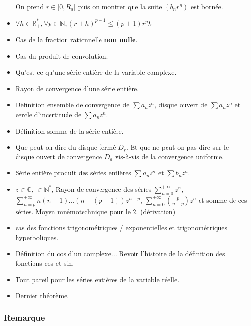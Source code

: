 \documentclass[a4paper, 11pt, hidelinks]{article}
\newcommand{\dsum}[2]{\displaystyle\sum_{#1}^{#2} }
\begin{document}
\begin{itemize}
    On prend $r\in [0,R_a[$ puis on montrer que la suite $(b_nr^n)$ est bornée.
    \item $\forall h \in \mathbb{R}^*_+, \forall p \in \mathbb{N}, (r+h)^{p+1} \leq (p+1)r^ph$
    \item Cas de la fraction rationnelle \textbf{non nulle}.
    \item Cas du produit de convolution.
    \item Qu'est-ce qu'une série entière de la variable complexe.
    \item Rayon de convergence d'une série entière.
    \item Définition ensemble de convergence de $\sum a_nz^n$, disque ouvert de $\sum a_nz^n$ et cercle d'incertitude de $\sum a_nz^n$.
    \item Définition somme de la série entière.
    \item Que peut-on dire du disque fermé $D_r$. Et que ne peut-on pas dire sur le disque ouvert de convergence $D_a$ vis-à-vis de la convergence uniforme.
    \item Série entière produit des séries entières $\sum a_n z^n$ et $\sum b_n z^n$.
    \item $z\in \mathbb{C}$, $\in \mathbb{N}^*$, Rayon de convergence des séries $\dsum{n=0}{+\infty} z^n$, $\dsum{n=p}{+ \infty} n(n-1)...(n-(p-1))z^{n-p}$, $\dsum{n=0}{+ \infty} \binom{p}{n+p}z^n$
    et somme de ces séries. Moyen mnémotechnique pour le $2$. (dérivation)
    \item cas des fonctions trigonométriques / exponentielles et trigonométriques hyperboliques.
    \item Définition du cos d'un complexe... Revoir l'histoire de la définition des fonctions cos et sin.
    \item Tout pareil pour les séries entières de la variable réelle.
    \item Dernier théorème.
\end{itemize}








\subsubsection{Remarque}
\end{document}
